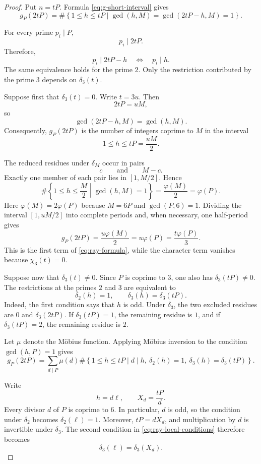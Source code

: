 \documentclass[12pt]{article}
\numberwithin{equation}{section}
\theoremstyle{definition}
\theoremstyle{remark}
\begin{document}
\begin{proof}
Put $n=tP$. Formula \eqref{eq:g-short-interval} gives
\[
g_P(2tP)
=
\#\left\{
1\leq h\leq tP
\mathrel{}\middle|\mathrel{}
\gcd(h,M)=\gcd(2tP-h,M)=1
\right\}.
\]

For every prime $p_i\mid P$,
\[
p_i\mid2tP.
\]
Therefore,
\[
p_i\mid2tP-h
\quad\Longleftrightarrow\quad
p_i\mid h.
\]
The same equivalence holds for the prime $2$. Only the
restriction contributed by the prime $3$ depends on
$\delta_3(t)$.

Suppose first that $\delta_3(t)=0$. Write $t=3u$. Then
\[
2tP=uM,
\]
so
\[
\gcd(2tP-h,M)=\gcd(h,M).
\]
Consequently, $g_P(2tP)$ is the number of integers coprime to
$M$ in the interval
\[
1\leq h\leq tP=\frac{uM}{2}.
\]

The reduced residues under $\delta_M$ occur in pairs
\[
c
\qquad\text{and}\qquad
M-c.
\]
Exactly one member of each pair lies in
$[1,M/2]$. Hence
\[
\#\left\{
1\leq h\leq \frac M2
\mathrel{}\middle|\mathrel{}
\gcd(h,M)=1
\right\}
=
\frac{\varphi(M)}2
=
\varphi(P).
\]
Here $\varphi(M)=2\varphi(P)$ because $M=6P$ and
$\gcd(P,6)=1$.
Dividing the interval $[1,uM/2]$ into complete periods and,
when necessary, one half-period gives
\[
g_P(2tP)
=
\frac{u\varphi(M)}2
=
u\varphi(P)
=
\frac{t\varphi(P)}3.
\]
This is the first term of \eqref{eq:ray-formula}, while the
character term vanishes because $\chi_3(t)=0$.

Suppose now that $\delta_3(t)\neq0$. Since $P$ is coprime to
$3$, one also has $\delta_3(tP)\neq0$. The restrictions at the
primes $2$ and $3$ are equivalent to
\begin{equation}
\label{eq:ray-local-conditions}
\delta_2(h)=1,
\qquad
\delta_3(h)=\delta_3(tP).
\end{equation}
Indeed, the first condition says that $h$ is odd. Under
$\delta_3$, the two excluded residues are $0$ and
$\delta_3(2tP)$. If $\delta_3(tP)=1$, the remaining residue is
$1$, and if $\delta_3(tP)=2$, the remaining residue is $2$.

Let $\mu$ denote the M\"obius function. Applying M\"obius inversion
to the condition $\gcd(h,P)=1$ gives
\[
g_P(2tP)
=
\sum_{d\mid P}\mu(d)
\#
\left\{
1\leq h\leq tP
\mathrel{}\middle|\mathrel{}
d\mid h,\
\delta_2(h)=1,\
\delta_3(h)=\delta_3(tP)
\right\}.
\]

Write
\[
h=d\ell,
\qquad
X_d=\frac{tP}{d}.
\]
Every divisor $d$ of $P$ is coprime to $6$. In particular, $d$
is odd, so the condition under $\delta_2$ becomes
$\delta_2(\ell)=1$. Moreover, $tP=dX_d$, and multiplication by
$d$ is invertible under $\delta_3$. The second condition in
\eqref{eq:ray-local-conditions} therefore becomes
\[
\delta_3(\ell)=\delta_3(X_d).
\]


\end{proof}
\end{document}
